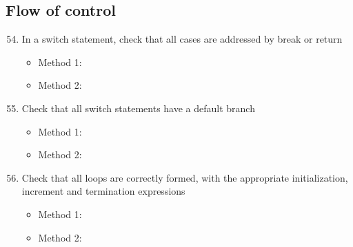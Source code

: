 \subsection{Flow of control}
\begin{enumerate}
\setcounter{enumi}{53}
	\item In a switch statement, check that all cases are addressed by break or return
	\begin{itemize}
		\item Method 1: \cmark
		\item Method 2:
	\end{itemize}
	\item Check that all switch statements have a default branch
	\begin{itemize}
		\item Method 1: \cmark
		\item Method 2:
	\end{itemize}
	\item Check that all loops are correctly formed, with the appropriate initialization, increment and termination expressions
	\begin{itemize}
		\item Method 1: \cmark
		\item Method 2:
	\end{itemize}
\end{enumerate}